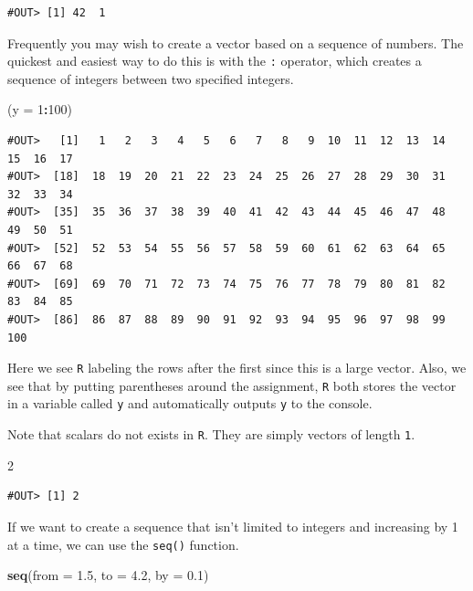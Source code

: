 \documentclass[]{book}
\newenvironment{Shaded}{\begin{snugshade}}{\end{snugshade}}
\newcommand{\DataTypeTok}[1]{\textcolor[rgb]{0.13,0.29,0.53}{#1}}
\newcommand{\DecValTok}[1]{\textcolor[rgb]{0.00,0.00,0.81}{#1}}
\newcommand{\FloatTok}[1]{\textcolor[rgb]{0.00,0.00,0.81}{#1}}
\newcommand{\KeywordTok}[1]{\textcolor[rgb]{0.13,0.29,0.53}{\textbf{#1}}}
\newcommand{\NormalTok}[1]{#1}
\newcommand{\OperatorTok}[1]{\textcolor[rgb]{0.81,0.36,0.00}{\textbf{#1}}}
\begin{document}
\begin{verbatim}
#OUT> [1] 42  1
\end{verbatim}

Frequently you may wish to create a vector based on a sequence of numbers. The quickest and easiest way to do this is with the \texttt{:} operator, which creates a sequence of integers between two specified integers.

\begin{Shaded}
\begin{Highlighting}[]
\NormalTok{(}\DataTypeTok{y =} \DecValTok{1}\OperatorTok{:}\DecValTok{100}\NormalTok{)}
\end{Highlighting}
\end{Shaded}

\begin{verbatim}
#OUT>   [1]   1   2   3   4   5   6   7   8   9  10  11  12  13  14  15  16  17
#OUT>  [18]  18  19  20  21  22  23  24  25  26  27  28  29  30  31  32  33  34
#OUT>  [35]  35  36  37  38  39  40  41  42  43  44  45  46  47  48  49  50  51
#OUT>  [52]  52  53  54  55  56  57  58  59  60  61  62  63  64  65  66  67  68
#OUT>  [69]  69  70  71  72  73  74  75  76  77  78  79  80  81  82  83  84  85
#OUT>  [86]  86  87  88  89  90  91  92  93  94  95  96  97  98  99 100
\end{verbatim}

Here we see \texttt{R} labeling the rows after the first since this is a large vector. Also, we see that by putting parentheses around the assignment, \texttt{R} both stores the vector in a variable called \texttt{y} and automatically outputs \texttt{y} to the console.

Note that scalars do not exists in \texttt{R}. They are simply vectors of length \texttt{1}.

\begin{Shaded}
\begin{Highlighting}[]
\DecValTok{2}
\end{Highlighting}
\end{Shaded}

\begin{verbatim}
#OUT> [1] 2
\end{verbatim}

If we want to create a sequence that isn't limited to integers and increasing by 1 at a time, we can use the \texttt{seq()} function.

\begin{Shaded}
\begin{Highlighting}[]
\KeywordTok{seq}\NormalTok{(}\DataTypeTok{from =} \FloatTok{1.5}\NormalTok{, }\DataTypeTok{to =} \FloatTok{4.2}\NormalTok{, }\DataTypeTok{by =} \FloatTok{0.1}\NormalTok{)}
\end{Highlighting}
\end{Shaded}
\end{document}
